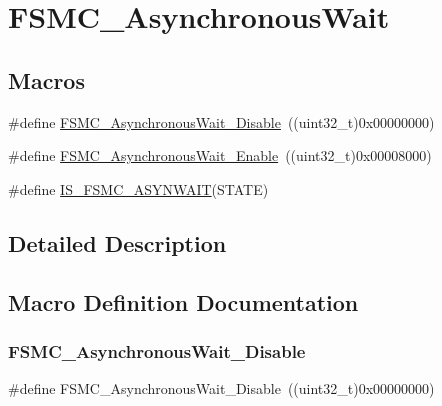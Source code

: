 \hypertarget{group___f_s_m_c___asynchronous_wait}{}\section{F\+S\+M\+C\+\_\+\+Asynchronous\+Wait}
\label{group___f_s_m_c___asynchronous_wait}
\subsection*{Macros}
\begin{DoxyCompactItemize}
\item 
\#define \mbox{\hyperlink{group___f_s_m_c___asynchronous_wait_ga36c0dad6fe6c0e01632d3312c8f4c4cb}{F\+S\+M\+C\+\_\+\+Asynchronous\+Wait\+\_\+\+Disable}}~((uint32\+\_\+t)0x00000000)
\item 
\#define \mbox{\hyperlink{group___f_s_m_c___asynchronous_wait_gaff524bfa697106ede7d4b557a5ad7d8c}{F\+S\+M\+C\+\_\+\+Asynchronous\+Wait\+\_\+\+Enable}}~((uint32\+\_\+t)0x00008000)
\item 
\#define \mbox{\hyperlink{group___f_s_m_c___asynchronous_wait_ga52d579de825316ee058baf11bfb749d6}{I\+S\+\_\+\+F\+S\+M\+C\+\_\+\+A\+S\+Y\+N\+W\+A\+IT}}(S\+T\+A\+TE)
\end{DoxyCompactItemize}


\subsection{Detailed Description}


\subsection{Macro Definition Documentation}
\mbox{\label{group___f_s_m_c___asynchronous_wait_ga36c0dad6fe6c0e01632d3312c8f4c4cb}} 
\subsubsection{\texorpdfstring{FSMC\_AsynchronousWait\_Disable}{FSMC\_AsynchronousWait\_Disable}}
{\footnotesize\ttfamily \#define F\+S\+M\+C\+\_\+\+Asynchronous\+Wait\+\_\+\+Disable~((uint32\+\_\+t)0x00000000)}

